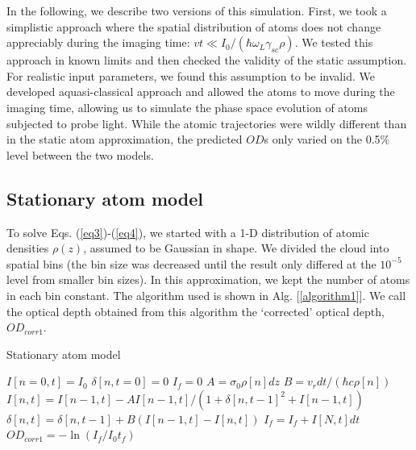 \documentclass[12pt]{iopart}
\begin{document}
\par In the following, we describe two versions of this simulation. First, we took a simplistic approach where the spatial distribution of atoms does not change appreciably during the imaging time: $vt\ll I_0/(\hbar \omega_L \gamma_{sc} \rho)$. We tested this approach in known limits and then checked the validity of the static assumption. For realistic input parameters, we found this assumption to be invalid. We developed aquasi-classical approach and allowed the atoms to move during the imaging time, allowing us to simulate the phase space evolution of atoms subjected to probe light. While the atomic trajectories were wildly different than in the static atom approximation, the predicted $OD$s only varied on the 0.5$\%$ level between the two models. 


\subsection{Stationary atom model}
To solve Eqs. (\ref{eq3})-(\ref{eq4}), we started with a 1-D distribution of atomic densities $\rho(z)$, assumed to be Gaussian in shape. We divided the cloud into spatial bins (the bin size was decreased until the result only differed at the $10^{-5}$ level from smaller bin sizes).  In this approximation, we kept the number of atoms in each bin constant.  The algorithm used is shown in Alg. [\ref{algorithm1}]. We call the optical depth obtained from this algorithm the `corrected' optical depth, $OD_{corr1}$.

\begin{algorithm}
\caption{Stationary atom model}
\label{algorithm1}
\begin{algorithmic}
\STATE $I[n=0,t]=I_0$  
\STATE $\delta[n, t=0]=0$ 
\STATE $I_f=0$ 
 \STATE $A=\sigma_0\rho[n] dz$ 
 \STATE $B=v_r dt/(\hbar c \rho[n])$  
\STATE $I[n,t]=I[n-1,t] - A I[n-1,t]/(1+\delta[n,t-1]^2+I[n-1,t])$  
\STATE $\delta[n,t]=\delta[n,t-1]+B\left(I[n-1,t]-I[n,t]\right)$   
\ENDFOR 
\STATE $I_f =I_f+ I[N,t]dt$ 
\ENDFOR
\STATE $OD_{corr1}=-\ln{(I_f/I_0t_f)}$
\end{algorithmic}
\end{algorithm}
\end{document}
